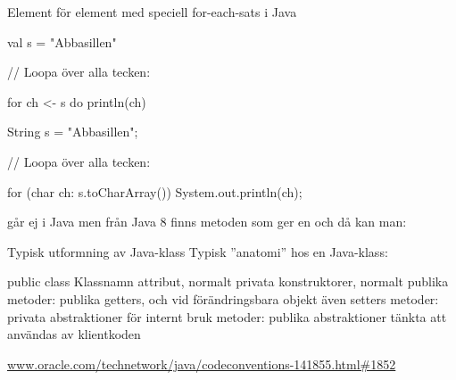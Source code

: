 \begin{Slide}{Element för element med speciell for-each-sats i Java}
\begin{multicols}{2}
\noindent{}
\begin{CodeSmall}[basicstyle=\ttfamily\SlideFontSize{6}{8},backgroundcolor=\color{white},
  frame=none]
val s = "Abbasillen"

// Loopa över alla tecken:

for ch <- s do println(ch)


\end{CodeSmall}

\columnbreak

\noindent{}
\begin{CodeSmall}[language=Java,basicstyle=\ttfamily\SlideFontSize{6}{8},backgroundcolor=\color{white},
  frame=none]
String s = "Abbasillen";

// Loopa över alla tecken:

for (char ch: s.toCharArray()) {
  System.out.println(ch);
}
\end{CodeSmall}
\end{multicols}

\pause
{\noindent\SlideFontSmall
{} går ej i Java men
från Java 8 finns metoden  som ger en  och då kan man: \\
 }
\end{Slide}






\begin{Slide}{Typisk utformning av Java-klass}
Typisk ''anatomi'' hos en Java-klass:
\begin{Code}[language=Java]
public class Klassnamn {
    attribut, normalt privata
    konstruktorer, normalt publika
    metoder: publika getters, och vid förändringsbara objekt även setters
    metoder: privata abstraktioner för internt bruk
    metoder: publika abstraktioner tänkta att användas av klientkoden
}
\end{Code}
\href{http://www.oracle.com/technetwork/java/codeconventions-141855.html#1852}{www.oracle.com/technetwork/java/codeconventions-141855.html\#1852}
\end{Slide}


